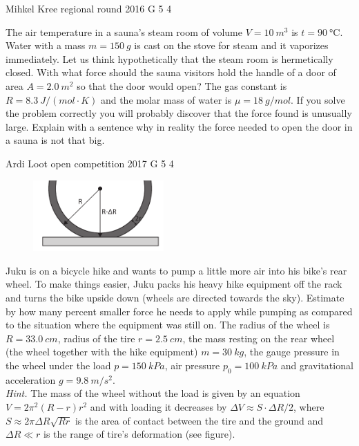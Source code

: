 \documentclass[11pt]{article}
\begin{document}
{Mihkel Kree} %
{regional round} %
{2016} %
{G 5} %
{4} %
{

\ifEngStatement
The air temperature in a sauna’s steam room of volume $V=\SI{10}{m^3}$ is $t=\SI{90}{\celsius}$. Water with a mass $m=\SI{150}{g}$ is cast on the stove for steam and it vaporizes immediately. Let us think hypothetically that the steam room is hermetically closed. With what force should the sauna visitors hold the handle of a door of area $A=\SI{2,0}{m^2}$ so that the door would open? The gas constant is $R=\SI{8.3}{J \per (mol\!\cdot\! K)}$ and the molar mass of water is $\mu=\SI{18}{g\per mol}$. If you solve the problem correctly you will probably discover that the force found is unusually large. Explain with a sentence why in reality the force needed to open the door in a sauna is not that big.
\fi
}

{Ardi Loot} %
{open competition} %
{2017} %
{G 5} %
{4} %
{

\ifEngStatement
\begin{figure}
	\vspace{-15pt}
	\includegraphics[width=5cm]{2017-lahg-05-fig_rattakumm}
\end{figure}
Juku is on a bicycle hike and wants to pump a little more air into his bike’s rear wheel. To make things easier, Juku packs his heavy hike equipment off the rack and turns the bike upside down (wheels are directed towards the sky). Estimate by how many percent smaller force he needs to apply while pumping as compared to the situation where the equipment was still on. The radius of the wheel is $R=\SI{33.0}{cm}$, radius of the tire $r=\SI{2.5}{cm}$, the mass resting on the rear wheel (the wheel together with the hike equipment) $m=\SI{30}{kg}$, the gauge pressure in the wheel under the load $p=\SI{150}{kPa}$, air pressure $p_{0}=\SI{100}{kPa}$ and gravitational acceleration $g=\SI{9.8}{m/s^{2}}$.\\
\emph{Hint.} The mass of the wheel without the load is given by an equation $V=2\pi^{2}\left(R-r\right)r^{2}$ and with loading it decreases by $\Delta V\approx S\cdot\Delta R/2$, where $S\approx2\pi\Delta R\sqrt{Rr}$ is the area of contact between the tire and the ground and $\Delta R\ll r$ is the range of tire’s deformation (see figure).
\fi
}
\end{document}
